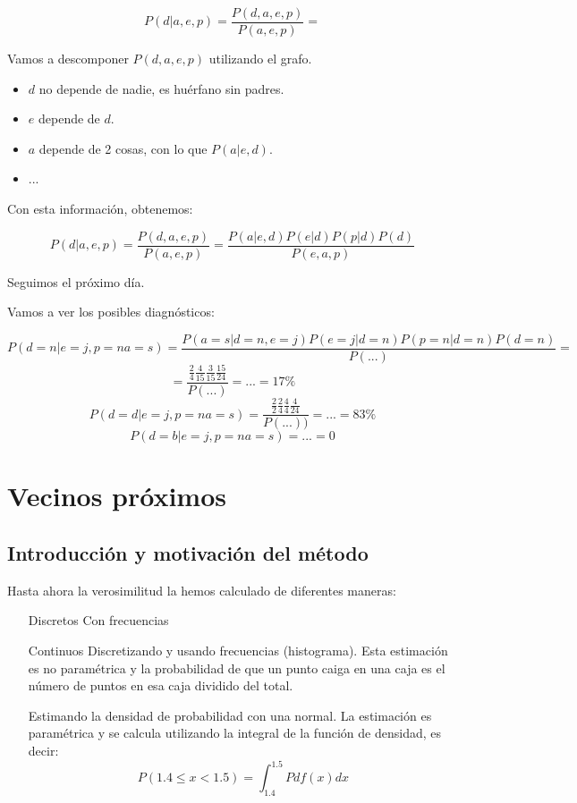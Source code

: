 \documentclass{apuntes}
\begin{document}
\[
P(d|a,e,p) = \frac{P(d,a,e,p)}{P(a,e,p)} = 
\]

Vamos a descomponer $P(d,a,e,p)$ utilizando el grafo. 

\begin{itemize}
	\item $d$ no depende de nadie, es huérfano sin padres.
	\item $e$ depende de $d$.
	\item $a$ depende de 2 cosas, con lo que $P(a|e,d)$.
	\item ...
\end{itemize}

Con esta información, obtenemos:

\[
P(d|a,e,p) = \frac{P(d,a,e,p)}{P(a,e,p)} =  \frac{P(a|e,d)P(e|d)P(p|d)P(d)}{P(e,a,p)}
\]

Seguimos el próximo día.


Vamos a ver los posibles diagnósticos:

\[
P(d=n|e=j,p=na=s) = \frac{P(a=s|d=n,e=j)P(e=j|d=n)P(p=n|d=n)P(d=n)}{P(...)} = 
\]
\[
= \frac{\frac{2}{4}\frac{4}{15}\frac{3}{15}\frac{15}{24}}{P(...)} = ... = 17\%
\]
\[
P(d=d|e=j,p=na=s) = \frac{\frac{2}{2}\frac{2}{4}\frac{4}{4}\frac{4}{24}}{P(...))} = ... = 83\%
\]
\[
P(d=b|e=j,p=na=s) = ... = 0
\]


\section{Vecinos próximos}

\subsection{Introducción y motivación del método}
Hasta ahora la verosimilitud la hemos calculado de diferentes maneras:

\begin{itemize}
 	\item[Discretos] Con frecuencias 
 	\item[Continuos]  Discretizando y usando frecuencias (histograma). Esta estimación es no paramétrica y la probabilidad de que un punto caiga en una caja es el número de puntos en esa caja dividido del total.
 	\item[] Estimando la densidad de probabilidad con una normal. La estimación es paramétrica y se calcula utilizando la integral de la función de densidad, es decir:
 	\[P(1.4 \leq x < 1.5) = \int_{1.4}^{1.5}P df(x)dx\]
 \end{itemize} 
\end{document}
